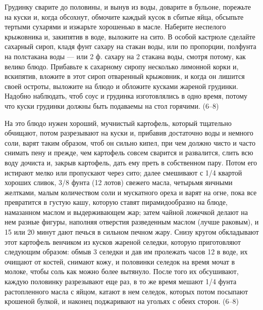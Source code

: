 
Грудинку сварите до половины, и вынув из воды, доварите в бульоне, порежьте на куски и, когда обсохнут, обмочите каждый кусок в сбитые яйца, обсыпьте тертыми сухарями и изжарьте хорошенько в масле. Наберите неспелого крыжовника и, закипятив в воде, выложите на сито. В особой кастрюле сделайте сахарный сироп, кладя фунт сахару на стакан воды, или по пропорции, полфунта на полстакана воды — или 2 ф. сахару на 2 стакана воды, смотря потому, как велико блюдо. Прибавьте к сахарному сиропу несколько лимонной корки и, вскипятив, вложите в этот сироп отваренный крыжовник, и когда он лишится своей остроты, выложите на блюдо и обложите кусками жареной грудинки. Надобно наблюдать, чтоб соус и грудинка изготовлялись в одно время, потому что куски грудинки должны быть подаваемы на стол горячими. (6--8) 


На это блюдо нужен хороший, мучнистый картофель, который тщательно обчищают, потом разрезывают на куски и, прибавив достаточно воды и немного соли, варят таким образом, чтоб он сильно кипел, при чем должно чисто и часто снимать пену и прежде, чем картофель совсем сварится и развалится, слить всю воду дочиста и, закрыв картофель, дать ему преть в собственном пару. Потом его истирают мелко или пропускают через сито; далее смешивают с 1/4 квартой хороших сливок, 3/8 фунта (12 лотов) свежего масла, четырьмя яичными желтками, малым количеством соли и мускатного ореха и варят на огне, пока все превратится в густую кашу, которую ставят пирамидообразно на блюде, намазанном маслом и выдерживающем жар; затем чайной ложечкой делают на нем разные фигуры, наполняя отверстия разведенным маслом (лучше раковым), и 15 или 20 минут дают печься в сильном печном жару. Снизу кругом обкладывают этот картофель венчиком из кусков жареной селедки, которую приготовляют следующим образом: обмыв 3 селедки и дав им пролежать часов 12 в воде, их очищают от костей, снимают кожу, и половинки селедок на время мочат в молоке, чтобы соль как можно более вытянуло. После того их обсушивают, каждую половинку разрезывают еще раз, в то же время мешают 1/4 фунта растопленного масла с яйцом, катают в нем селедок, которых потом посыпают крошеной булкой, и наконец поджаривают на угольях с обеих сторон. (6--8) 


